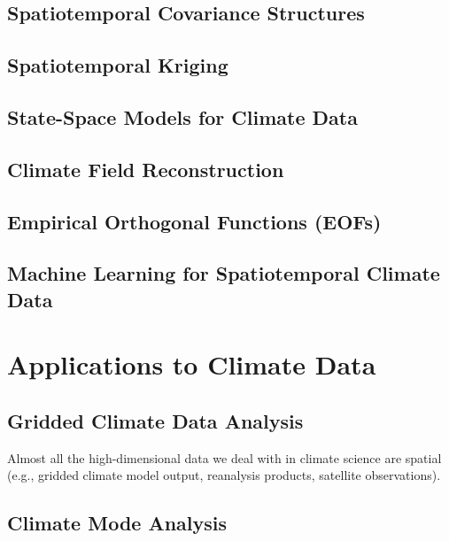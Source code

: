 \documentclass[
  letterpaper,
  DIV=11,
  numbers=noendperiod]{scrreprt}
\begin{document}
\subsection{Spatiotemporal Covariance
Structures}\label{spatiotemporal-covariance-structures}

\subsection{Spatiotemporal Kriging}\label{spatiotemporal-kriging}

\subsection{State-Space Models for Climate
Data}\label{state-space-models-for-climate-data}

\subsection{Climate Field
Reconstruction}\label{climate-field-reconstruction}

\subsection{Empirical Orthogonal Functions
(EOFs)}\label{empirical-orthogonal-functions-eofs}

\subsection{Machine Learning for Spatiotemporal Climate
Data}\label{machine-learning-for-spatiotemporal-climate-data}

\section{Applications to Climate
Data}\label{applications-to-climate-data}

\subsection{Gridded Climate Data
Analysis}\label{gridded-climate-data-analysis}

Almost all the high-dimensional data we deal with in climate science are
spatial (e.g., gridded climate model output, reanalysis products,
satellite observations).

\subsection{Climate Mode Analysis}\label{climate-mode-analysis}
\end{document}
